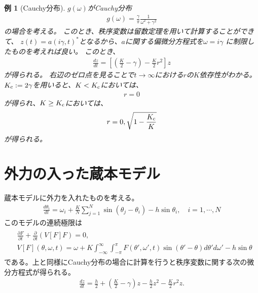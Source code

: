 \documentclass{jsarticle}
\newtheorem{eg}{例}
\begin{document}
\begin{eg}[Cauchy分布]
$g(\omega)$がCauchy分布
\begin{align}
g(\omega)=\frac{\gamma}{\pi}\frac{1}{\omega^{2}+\gamma^{2}}
\end{align}
の場合を考える。
このとき、秩序変数は留数定理を用いて計算することができて、
$z(t)=a(i\gamma,t)^{*}$となるから、$a$に関する偏微分方程式を$\omega=i\gamma$
に制限したものを考えれば良い。
このとき、
\begin{align}
\frac{dz}{dt}=\left[\left(\frac{K}{2}-\gamma\right)-\frac{K}{2}r^{2}\right]z
\end{align}
が得られる。
右辺のゼロ点を見ることで$t\to\infty$における$r$の$K$依存性がわかる。
$K_{\rm c}:=2\gamma$を用いると、$K<K_{\rm c}$においては、
\begin{align}
r=0
\end{align}
が得られ、$K\geq K_{\rm c}$においては、
\begin{align}
r=0,\sqrt{1-\frac{K_{\rm c}}{K}}
\end{align}
が得られる。
\end{eg}

\section{外力の入った蔵本モデル}
蔵本モデルに外力を入れたものを考える。
\begin{align}
\frac{d\theta_{i}}{dt}=\omega_{i}+\frac{K}{N}\sum_{j=1}^{N}\sin(\theta_{j}-\theta_{i})-h\sin\theta_{i},\quad i=1,\cdots,N
\end{align}
このモデルの連続極限は
\begin{align}
\begin{split}
&\frac{\partial F}{\partial t}+\frac{\partial}{\partial t}(V[F]F)=0,\\
&V[F](\theta,\omega,t)=\omega+K\int_{-\infty}^{\infty}\int_{-\pi}^{\pi} F(\theta',\omega',t)\sin(\theta'-\theta)d\theta'd\omega'-h\sin\theta
\end{split}
\end{align}
である。上と同様にCauchy分布の場合に計算を行うと秩序変数に関する次の微分方程式が得られる。
\begin{align}
\frac{dz}{dt}=\frac{h}{2}+(\frac{K}{2}-\gamma)z-\frac{h}{2}z^{2}-\frac{K}{2}r^{2}z.
\end{align}



\end{document}
